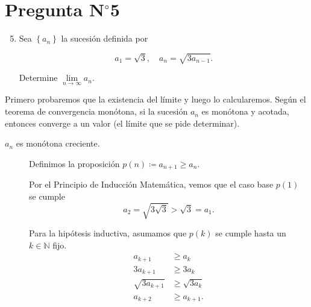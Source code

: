 

\section{Pregunta N$^{\circ}$5}

\begin{frame}

    \begin{enumerate}\setcounter{enumi}{4}
        \item

              Sea $\left\{a_{n}\right\}$ la sucesión definida por

              \begin{equation*}
                  a_{1}=\sqrt{3},\quad
                  a_{n}=\sqrt{3a_{n-1}}.
              \end{equation*}

              Determine $\lim\limits_{n\to\infty}a_{n}$.
    \end{enumerate}

    \begin{solution}
        Primero probaremos que la \alert{existencia del límite} y
        luego lo calcularemos.
        Según el teorema de convergencia monótona, si la sucesión
        $a_{n}$ es monótona y acotada, entonces converge a un valor
        (el límite que se pide determinar).

        \begin{description}
            \item[$a_{n}$ es monótona creciente.]

                Definimos la proposición
                \begin{math}
                    p\left(n\right)\coloneqq
                    a_{n+1}\geq a_{n}
                \end{math}.

                Por el \alert{Principio de Inducción Matemática},
                vemos que el caso base $p\left(1\right)$ se cumple
                \begin{equation*}
                    a_{2}=
                    \sqrt{3\sqrt3}>
                    \sqrt{3}=a_{1}.
                \end{equation*}

                Para la hipótesis inductiva, asumamos que
                $p\left(k\right)$ se cumple hasta un $k\in\mathbb{N}$
                fijo.
                \begin{align*}
                    a_{k+1}         & \geq a_{k}        \\
                    3a_{k+1}        & \geq 3a_{k}       \\
                    \sqrt{3a_{k+1}} & \geq\sqrt{3a_{k}} \\
                    a_{k+2}         & \geq a_{k+1}.
                \end{align*}


\end{description}
\end{solution}
\end{frame}
